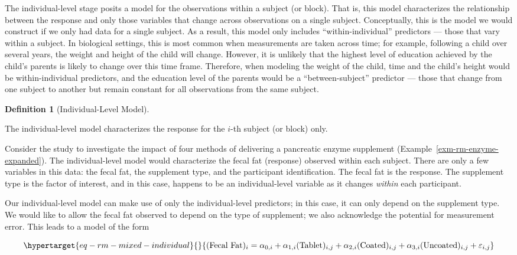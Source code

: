 \documentclass[
  letterpaper,
  DIV=11,
  numbers=noendperiod]{scrreprt}
\theoremstyle{definition}
\newtheorem{definition}{Definition}[chapter]
\theoremstyle{definition}
\theoremstyle{remark}
\begin{document}
The individual-level stage posits a model for the observations within a
subject (or block). That is, this model characterizes the relationship
between the response and only those variables that change across
observations on a single subject. Conceptually, this is the model we
would construct if we only had data for a single subject. As a result,
this model only includes ``within-individual'' predictors --- those that
vary within a subject. In biological settings, this is most common when
measurements are taken across time; for example, following a child over
several years, the weight and height of the child will change. However,
it is unlikely that the highest level of education achieved by the
child's parents is likely to change over this time frame. Therefore,
when modeling the weight of the child, time and the child's height would
be within-individual predictors, and the education level of the parents
would be a ``between-subject'' predictor --- those that change from one
subject to another but remain constant for all observations from the
same subject.

\begin{definition}[Individual-Level
Model]\protect\hypertarget{def-individual-model}{}\label{def-individual-model}

The individual-level model characterizes the response for the \(i\)-th
subject (or block) only.

\end{definition}

Consider the study to investigate the impact of four methods of
delivering a pancreatic enzyme supplement
(Example~\ref{exm-rm-enzyme-expanded}). The individual-level model would
characterize the fecal fat (response) observed within each subject.
There are only a few variables in this data: the fecal fat, the
supplement type, and the participant identification. The fecal fat is
the response. The supplement type is the factor of interest, and in this
case, happens to be an individual-level variable as it changes
\emph{within} each participant.

Our individual-level model can make use of only the individual-level
predictors; in this case, it can only depend on the supplement type. We
would like to allow the fecal fat observed to depend on the type of
supplement; we also acknowledge the potential for measurement error.
This leads to a model of the form

\begin{equation}\protect\hypertarget{eq-rm-mixed-individual}{}{(\text{Fecal Fat})_i = \alpha_{0,i} + \alpha_{1,i} (\text{Tablet})_{i,j} + \alpha_{2,i} (\text{Coated})_{i,j} + \alpha_{3,i} (\text{Uncoated})_{i,j} + \varepsilon_{i,j}}\label{eq-rm-mixed-individual}\end{equation}
\end{document}
